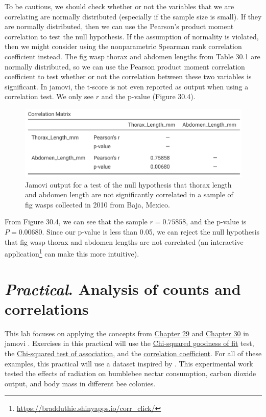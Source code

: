 \documentclass[
  openany]{scrbook}
\begin{document}
To be cautious, we should check whether or not the variables that we are correlating are normally distributed (especially if the sample size is small).
If they are normally distributed, then we can use the Pearson's product moment correlation to test the null hypothesis.
If the assumption of normality is violated, then we might consider using the nonparametric Spearman rank correlation coefficient instead.
The fig wasp thorax and abdomen lengths from Table 30.1 are normally distributed, so we can use the Pearson product moment correlation coefficient to test whether or not the correlation between these two variables is significant.
In jamovi, the t-score is not even reported as output when using a correlation test.
We only see \(r\) and the p-value (Figure 30.4).

\begin{figure}
\includegraphics[width=1\linewidth]{img/Jamovi_correlation_output} \caption{Jamovi output for a test of the null hypothesis that thorax length and abdomen length are not significantly correlated in a sample of fig wasps collected in 2010 from Baja, Mexico.}\label{fig:unnamed-chunk-131}
\end{figure}

From Figure 30.4, we can see that the sample \(r = 0.75858\), and the p-value is \(P = 0.00680\).
Since our p-value is less than 0.05, we can reject the null hypothesis that fig wasp thorax and abdomen lengths are not correlated (an interactive application\footnote{\url{https://bradduthie.shinyapps.io/corr_click/}} can make this more intuitive).

\hypertarget{Chapter_31}{%
\chapter{\texorpdfstring{\emph{Practical}. Analysis of counts and correlations}{Practical. Analysis of counts and correlations}}\label{Chapter_31}}

This lab focuses on applying the concepts from \protect\hyperlink{Chapter_29}{Chapter 29} and \protect\hyperlink{Chapter_30}{Chapter 30} in jamovi \citep{Jamovi2022}.
Exercises in this practical will use the \protect\hyperlink{chi-squared-goodness-of-fit}{Chi-squared goodness of fit} test, the \protect\hyperlink{chi-squared-test-of-association}{Chi-squared test of association},
and the \protect\hyperlink{correlation-hypothesis-testing}{correlation coefficient}.
For all of these examples, this practical will use a dataset inspired by \citet{Burrows2022}.
This experimental work tested the effects of radiation on bumblebee nectar consumption, carbon dioxide output, and body mass in different bee colonies.
\end{document}
